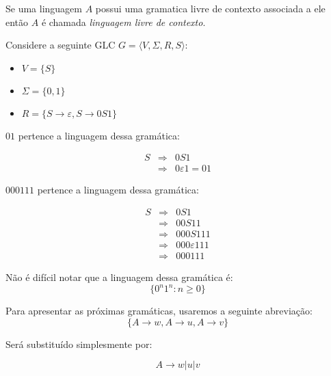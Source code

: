 Se uma linguagem $A$ possui uma gramatica livre de contexto associada a ele então $A$ é chamada {\em linguagem livre de contexto}.

\begin{example}
Considere a seguinte GLC $G = \langle V, \Sigma, R, S \rangle$:
\begin{itemize}
\item $V = \{S\}$
\item $\Sigma = \{0, 1\}$
\item $R = \{S \to \varepsilon, S \to 0S1\}$
\end{itemize}

$01$ pertence a linguagem dessa gramática:


\begin{eqnarray*}
  S & \Rightarrow & 0S1 \\
    & \Rightarrow & 0 \varepsilon 1 = 01
\end{eqnarray*}

$000111$ pertence a linguagem dessa gramática:


\begin{eqnarray*}
  S & \Rightarrow & 0S1\\
    & \Rightarrow & 00S11\\
    & \Rightarrow & 000S111\\
    & \Rightarrow & 000\varepsilon 111\\
    & \Rightarrow & 000111
\end{eqnarray*}

Não é difícil notar que a linguagem dessa gramática é:
\begin{displaymath}
  \{0^n 1^n : n \geq 0 \}
\end{displaymath}
\end{example}

Para apresentar as próximas gramáticas, usaremos a seguinte abreviação:
\begin{displaymath}
  \{A \to w, A \to u, A \to v\}
\end{displaymath}

Será substituído simplesmente por:

\begin{displaymath}
  A \to w | u | v
\end{displaymath}

